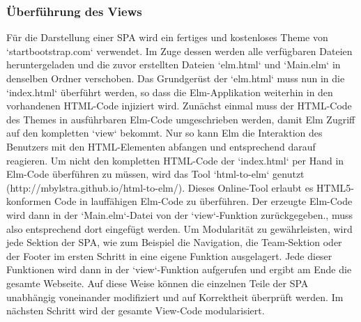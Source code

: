 \subsubsection{Überführung des Views}
\label{sec:Überführung des Views}
Für die Darstellung einer SPA wird ein fertiges und kostenloses Theme von `startbootstrap.com` verwendet. Im Zuge dessen werden alle verfügbaren Dateien heruntergeladen und die zuvor erstellten Dateien `elm.html` und `Main.elm` in denselben Ordner verschoben.
Das Grundgerüst der `elm.html` muss nun in die `index.html` überführt werden, so dass die Elm-Applikation weiterhin in den vorhandenen HTML-Code injiziert wird.
Zunächst einmal muss der HTML-Code des Themes in ausführbaren Elm-Code umgeschrieben werden, damit Elm Zugriff auf den kompletten `view` bekommt. Nur so kann Elm die Interaktion des Benutzers mit den HTML-Elementen abfangen und entsprechend darauf reagieren. Um nicht den kompletten HTML-Code der `index.html` per Hand in Elm-Code überführen zu müssen, wird das Tool `html-to-elm` genutzt (http://mbylstra.github.io/html-to-elm/). Dieses Online-Tool erlaubt es HTML5-konformen Code in lauffähigen Elm-Code zu überführen. Der erzeugte Elm-Code wird dann in der `Main.elm`-Datei von der `view`-Funktion zurückgegeben., muss also entsprechend dort eingefügt werden.
Um Modularität zu gewährleisten, wird jede Sektion der SPA, wie zum Beispiel die Navigation, die Team-Sektion oder der Footer im ersten Schritt in eine eigene Funktion ausgelagert. Jede dieser Funktionen wird dann in der `view`-Funktion aufgerufen und ergibt am Ende die gesamte Webseite. Auf diese Weise können die einzelnen Teile der SPA unabhängig voneinander modifiziert und auf Korrektheit überprüft werden. Im nächsten Schritt wird der gesamte View-Code modularisiert.

